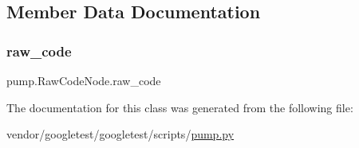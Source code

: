 \subsection{Member Data Documentation}
\mbox{\label{classpump_1_1_raw_code_node_ab36224d959e0d8f803e9fac8e6a0baab}} 
\subsubsection{\texorpdfstring{raw\+\_\+code}{raw\_code}}
{\footnotesize\ttfamily pump.\+Raw\+Code\+Node.\+raw\+\_\+code}



The documentation for this class was generated from the following file\+:\begin{DoxyCompactItemize}
\item 
vendor/googletest/googletest/scripts/\hyperlink{pump_8py}{pump.\+py}\end{DoxyCompactItemize}
